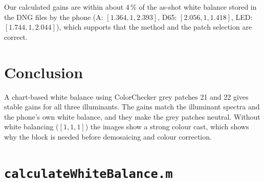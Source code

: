 \documentclass[11pt,a4paper]{article}
\begin{document}
Our calculated gains are within about 4\,\% of the as-shot white balance stored
in the DNG files by the phone (A: $[1.364, 1, 2.393]$,
D65: $[2.056, 1, 1.418]$, LED: $[1.744, 1, 2.044]$), which supports that the
method and the patch selection are correct.

\section{Conclusion}

A chart-based white balance using ColorChecker grey patches 21 and 22 gives
stable gains for all three illuminants. The gains match the illuminant spectra
and the phone's own white balance, and they make the grey patches neutral.
Without white balancing ($[1, 1, 1]$) the images show a strong colour cast,
which shows why the block is needed before demosaicing and colour correction.

\clearpage
\appendix
\section{\texttt{calculateWhiteBalance.m}}
\label{app:code}
\end{document}
